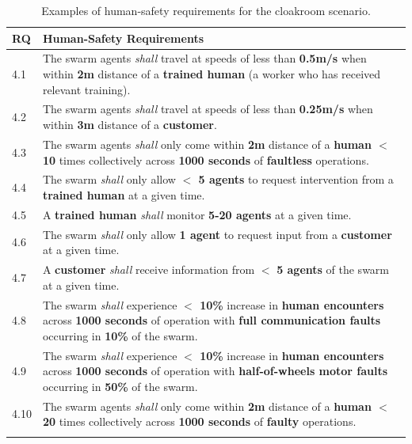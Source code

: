 \documentclass[runningheads]{llncs}
\begin{document}
\begin{table}[!h]
	\centering
	\begin{tabular}{p{6mm} p{118mm}}%
		\textbf{RQ} & \textbf{Human-Safety Requirements} \\
		\hline
		4.1 & The swarm agents \emph{shall} travel at speeds of less than \textbf{0.5m/s} when within \textbf{2m} distance of a \textbf{trained human} (a worker who has received relevant training).
		\\ 
		\hline
		4.2 & The swarm agents \emph{shall} travel at speeds of less than \textbf{0.25m/s} when within \textbf{3m} distance of a \textbf{customer}.
		\\ 
		\hline
		4.3 & The swarm agents \emph{shall} only come within \textbf{2m} distance of a \textbf{human $<$ 10} times collectively across \textbf{1000 seconds} of \textbf{faultless} operations.
		\\ 
		\hline
		4.4 & The swarm \emph{shall} only allow \textbf{$<$ 5 agents} to request intervention from a \textbf{trained human} at a given time.
		\\ 
		\hline
		4.5 & A \textbf{trained human} \emph{shall} monitor \textbf{5-20 agents} at a given time.
		\\ 
		\hline
		4.6 & The swarm \emph{shall} only allow \textbf{1 agent} to request input from a \textbf{customer} at a given time.
		\\ 
		\hline
		4.7 & A \textbf{customer} \emph{shall} receive  information from $<$ \textbf{5 agents} of the swarm at a given time.
		\\ 
		\hline
		4.8 & The swarm \emph{shall} experience \textbf{$<$ 10\%} increase in \textbf{human encounters} across \textbf{1000 seconds} of operation with \textbf{full communication faults} occurring in \textbf{10\%} of the swarm. \\
		\hline
		4.9 & The swarm \emph{shall} experience \textbf{$<$ 10\%} increase in \textbf{human encounters }across \textbf{1000 seconds} of operation with \textbf{half-of-wheels motor faults} occurring in \textbf{50\%} of the swarm.\\
		\hline
		4.10 & The swarm agents \emph{shall} only come within \textbf{2m} distance of a \textbf{human $<$ 20} times collectively across \textbf{1000 seconds} of \textbf{faulty} operations.
		\\				
		\hline \\[-1\medskipamount]
	\end{tabular}
	\caption{\label{tab:human-s}Examples of human-safety requirements for the cloakroom scenario.}
	\vspace{-7ex}%
\end{table}   
\end{document}

